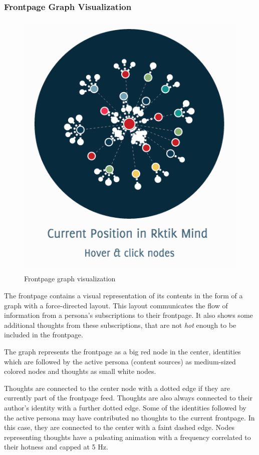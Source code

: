 \subsubsection{Frontpage Graph
Visualization}\label{frontpage-graph-visualization}

\begin{figure}[htbp]
\centering
\includegraphics{img/graph.png}
\caption{Frontpage graph visualization}
\end{figure}

The frontpage contains a visual representation of its contents in the
form of a graph with a force-directed layout. This layout communicates
the flow of information from a persona's subscriptions to their
frontpage. It also shows some additional thoughts from these
subscriptions, that are not \emph{hot} enough to be included in the
frontpage.

The graph represents the frontpage as a big red node in the center,
identities which are followed by the active persona (content sources) as
medium-sized colored nodes and thoughts as small white nodes.

Thoughts are connected to the center node with a dotted edge if they are
currently part of the frontpage feed. Thoughts are also always connected
to their author's identity with a further dotted edge. Some of the
identities followed by the active persona may have contributed no
thoughts to the current frontpage. In this case, they are connected to
the center with a faint dashed edge. Nodes representing thoughts have a
pulsating animation with a frequency correlated to their hotness and
capped at 5 Hz.

